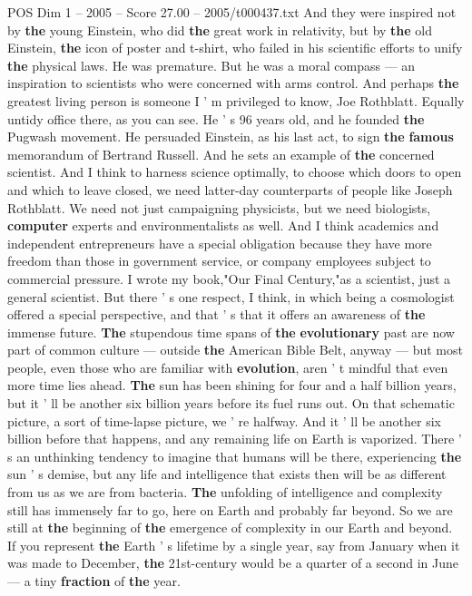 \begin{textsample}{POS Dim 1 – 2005 – Score 27.00 – 2005/t000437.txt}
And they were inspired not by \textbf{the} young Einstein, who did \textbf{the} great work in relativity, but by \textbf{the} old Einstein, \textbf{the} icon of poster and t-shirt, who failed in his scientific efforts to unify \textbf{the} physical laws.
He was premature.
But he was a moral compass — an inspiration to scientists who were concerned with arms control.
And perhaps \textbf{the} greatest living person is someone I ' m privileged to know, Joe Rothblatt.
Equally untidy office there, as you can see.
He ' s 96 years old, and he founded \textbf{the} Pugwash movement.
He persuaded Einstein, as his last act, to sign \textbf{the} \textbf{famous} memorandum of Bertrand Russell.
And he sets an example of \textbf{the} concerned scientist.
And I think to harness science optimally, to choose which doors to open and which to leave closed, we need latter-day counterparts of people like Joseph Rothblatt.
We need not just campaigning physicists, but we need biologists, \textbf{computer} experts and environmentalists as well.
And I think academics and independent entrepreneurs have a special obligation because they have more freedom than those in government service, or company employees subject to commercial pressure.
I wrote my book,"Our Final Century,"as a scientist, just a general scientist.
But there ' s one respect, I think, in which being a cosmologist offered a special perspective, and that ' s that it offers an awareness of \textbf{the} immense future. \textbf{The} stupendous time spans of \textbf{the} \textbf{evolutionary} past are now part of common culture — outside \textbf{the} American Bible Belt, anyway — but most people, even those who are familiar with \textbf{evolution}, aren ' t mindful that even more time lies ahead. \textbf{The} sun has been shining for four and a half billion years, but it ' ll be another six billion years before its fuel runs out.
On that schematic picture, a sort of time-lapse picture, we ' re halfway.
And it ' ll be another six billion before that happens, and any remaining life on Earth is vaporized.
There ' s an unthinking tendency to imagine that humans will be there, experiencing \textbf{the} sun ' s demise, but any life and intelligence that exists then will be as different from us as we are from bacteria. \textbf{The} unfolding of intelligence and complexity still has immensely far to go, here on Earth and probably far beyond.
So we are still at \textbf{the} beginning of \textbf{the} emergence of complexity in our Earth and beyond.
If you represent \textbf{the} Earth ' s lifetime by a single year, say from January when it was made to December, \textbf{the} 21st-century would be a quarter of a second in June — a tiny \textbf{fraction} of \textbf{the} year.

\end{textsample}
